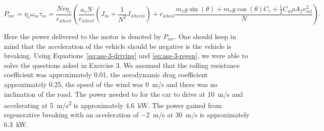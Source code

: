 \documentclass[11pt,titlepage]{report}
\begin{document}
\begin{equation} \label{eq:ass-3-regen}
	P_{mr} = \eta_r \omega_m \tau_{m} =
	\frac{N v \eta_r}{r_{wheel}} \left(
		\frac{a_v N}{r_{wheel}} (J_m + \frac{1}{N^2} J_{wheels}) + r_{wheel} \frac{
			m_v g \sin{(\theta)} +
			m_v g \cos{(\theta)} C_r +
			\frac{1}{2} C_w \rho A_f v_{rel}^2
		}{N}
	\right).
\end{equation}

Here the power delivered to the motor is denoted by $P_{mr}$. One should keep in mind that the acceleration of the vehicle should be negative is the vehicle is breaking. Using Equations~\ref{eq:ass-3-driving} and \ref{eq:ass-3-regen}, we were able to solve the questions asked in Exercise 3. We assumed that the rolling resistance coefficient was approximately \num{0.01}, the aerodynamic drag coefficient approximately \num{0.25}, the speed of the wind was \SI{0}{m/s} and there was no inclination of the road. The power needed to for the car to drive at \SI{10}{m/s} and accelerating at \SI{5}{m/s^2} is approximately \SI{4.6}{kW}. The power gained from regenerative breaking with an acceleration of \SI{-2}{m/s} at \SI{30}{m/s} is approximately \SI{6.3}{kW}.
\end{document}
